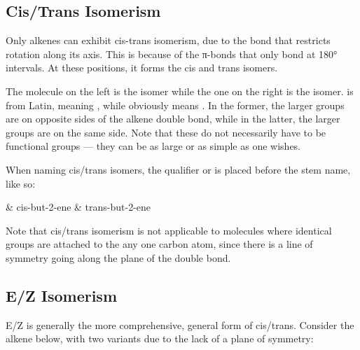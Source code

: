		\pagebreak
		\subsection{Cis/Trans Isomerism}

			Only alkenes can exhibit cis-trans isomerism, due to the  bond that restricts rotation along its axis. This is because
			of the π-bonds that only bond at 180° intervals. At these positions, it forms the cis and trans isomers.


			The molecule on the left is the  isomer while the one on the right is the  isomer. 
			is from Latin, meaning , while  obviously means . In the former,
			the larger groups are on opposite sides of the alkene double bond, while in the latter, the larger groups are on the same
			side. Note that these  do not necessarily have to be functional groups --- they can be as large or as simple
			as one wishes.

			When naming cis/trans isomers, the qualifier  or  is placed before the stem name, like so:
			\begin{bulletlist}
				& cis-but-2-ene
				& trans-but-2-ene
			\end{bulletlist}

			Note that cis/trans isomerism is not applicable to molecules where identical groups are attached to the any one carbon atom,
			since there is a line of symmetry going along the plane of the double bond.






		\pagebreak
		\subsection{E/Z Isomerism}

			E/Z is generally the more comprehensive, general form of cis/trans. Consider the alkene below, with two variants
			due to the lack of a plane of symmetry:

